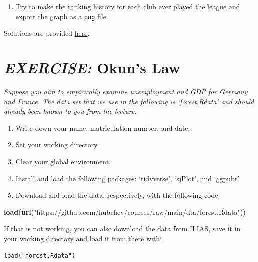 \documentclass[
  12pt,
  oneside]{book}
\newenvironment{Shaded}{\begin{snugshade}}{\end{snugshade}}
\newcommand{\FunctionTok}[1]{\textcolor[rgb]{0.13,0.29,0.53}{\textbf{#1}}}
\newcommand{\NormalTok}[1]{#1}
\newcommand{\StringTok}[1]{\textcolor[rgb]{0.31,0.60,0.02}{#1}}
\providecommand{\tightlist}{%
  \setlength{\itemsep}{0pt}\setlength{\parskip}{0pt}}
\begin{document}
\begin{enumerate}
\def\labelenumi{\arabic{enumi}.}
\setcounter{enumi}{34}
\tightlist
\item
  Try to make the ranking history for each club ever played the league and export the graph as a \texttt{png} file.
\end{enumerate}

Solutions are provided \href{https://raw.githubusercontent.com/hubchev/courses/main/scr/bundesliga.R}{here}.

\hypertarget{exercise-okuns-law}{%
\section*{\texorpdfstring{\emph{EXERCISE:} Okun's Law}{EXERCISE: Okun's Law}}\label{exercise-okuns-law}}

\emph{Suppose you aim to empirically examine unemployment and GDP for Germany and France.
The data set that we use in the following is `forest.Rdata' and should already
been known to you from the lecture.}

\begin{enumerate}
\def\labelenumi{(\arabic{enumi})}
\setcounter{enumi}{-1}
\item
  Write down your name, matriculation number, and date.
\item
  Set your working directory.
\item
  Clear your global environment.
\item
  Install and load the following packages: `tidyverse', `sjPlot', and `ggpubr'
\item
  Download and load the data, respectively, with the following code:
\end{enumerate}

\begin{Shaded}
\begin{Highlighting}[]
\FunctionTok{load}\NormalTok{(}\FunctionTok{url}\NormalTok{(}\StringTok{"https://github.com/hubchev/courses/raw/main/dta/forest.Rdata"}\NormalTok{))}
\end{Highlighting}
\end{Shaded}

If that is not working, you can also download the data from ILIAS, save it in
your working directory and load it from there with:

\begin{verbatim}
load("forest.Rdata")
\end{verbatim}
\end{document}
